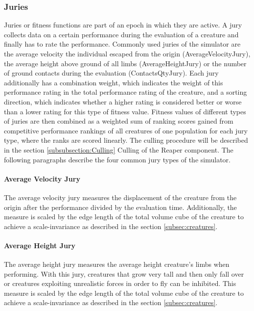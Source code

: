 \documentclass[main]{subfiles}
\begin{document}
\subsubsection{Juries}

Juries or fitness functions are part of an epoch in which they are active. A jury collects data on a certain performance during the evaluation of a creature and finally has to rate the performance. Commonly used juries of the simulator are the average velocity the individual escaped from the origin (AverageVelocityJury), the average height above ground of all limbs (AverageHeightJury) or the number of ground contacts during the evaluation (ContactsQtyJury). Each jury additionally has a combination weight, which indicates the weight of this performance rating in the total performance rating of the creature, and a sorting direction, which indicates whether a higher rating is considered better or worse than a lower rating for this type of fitness value. Fitness values of different types of juries are then combined as a weighted sum of ranking scores gained from competitive performance rankings of all creatures of one population for each jury type, where the ranks are scored linearly. The culling procedure will be described in the section \ref{subsubsection:Culling} Culling of the Reaper component. The following paragraphs describe the four common jury types of the simulator.

\paragraph{Average Velocity Jury} The average velocity jury measures the displacement of the creature from the origin after the performance divided by the evaluation time. Additionally, the measure is scaled by the edge length of the total volume cube of the creature to achieve a scale-invariance as described in the section \ref{subsec:creatures}.

\paragraph{Average Height Jury} The average height jury measures the average height creature's limbs when performing. With this jury, creatures that grow very tall and then only fall over or creatures exploiting unrealistic forces in order to fly can be inhibited. This measure is scaled by the edge length of the total volume cube of the creature to achieve a scale-invariance as described in the section \ref{subsec:creatures}.
\end{document}
